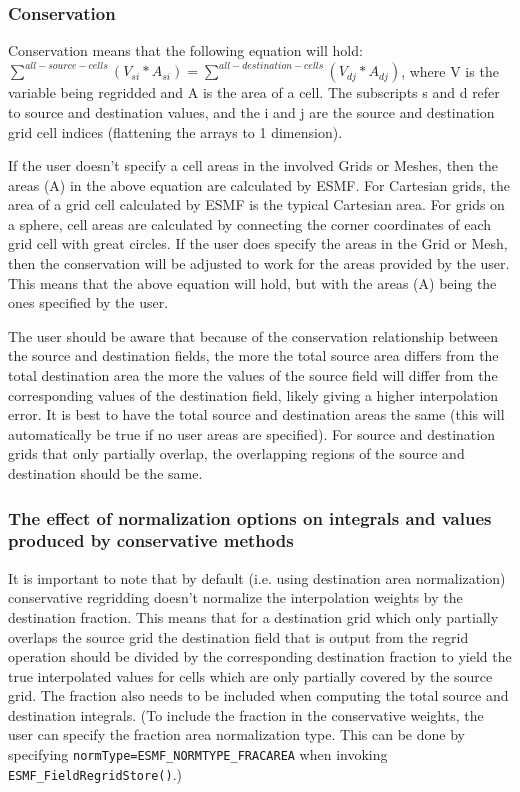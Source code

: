 \subsubsection{Conservation}\label{sec:interpolation:conservation}
 Conservation means that the following equation will hold:  $\sum^{all-source-cells}(V_{si}*A_{si}) = \sum^{all-destination-cells}(V_{dj}*A_{dj})$, where
 V is the variable being regridded and A is the area of a cell.  The subscripts s and d refer to source and destination values, and the i and j are the source  and destination grid cell indices (flattening the arrays to 1 dimension). 

 If the user doesn't specify a cell areas in the involved Grids or Meshes, then the areas (A) in the above equation are calculated by ESMF. 
 For Cartesian grids, the area of a grid cell calculated by ESMF is the typical Cartesian area. 
 For grids on a sphere, cell areas are calculated by connecting the corner coordinates of each grid cell with great circles. If the user 
 does specify the areas in the Grid or Mesh, then the conservation will be adjusted to work for the areas 
 provided by the user. This means that the above equation will hold, but with the areas (A) being the ones specified by the user.

 The user should be aware that because of the conservation relationship between the source and destination fields, the more the total source area
 differs from the total destination area the more the values of the source field will differ from the corresponding values of the destination field, 
 likely giving a higher interpolation error. It is best to have the total source and destination areas the same 
 (this will automatically be true if no user areas are specified). For source and destination grids 
 that only partially overlap, the overlapping regions of the source and destination should be the same.

\subsubsection{The effect of normalization options on integrals and values produced by conservative methods}\label{sec:interpolation:conservative_norm_opts}
 It is important to note that by default (i.e. using destination area normalization) 
conservative regridding doesn't normalize the interpolation weights by the destination fraction. 
This means that for a destination grid which only partially overlaps the source grid
the destination field that is output from the regrid operation 
should be divided by the corresponding destination fraction to yield the 
true interpolated values for cells which are only partially covered by the source grid. 
The fraction also needs to be included when computing the total source and destination integrals. 
(To include the fraction in the conservative weights, the user can specify 
the fraction area normalization type. This can be done by specifying {\tt normType=ESMF\_NORMTYPE\_FRACAREA} when
invoking {\tt ESMF\_FieldRegridStore()}.)

